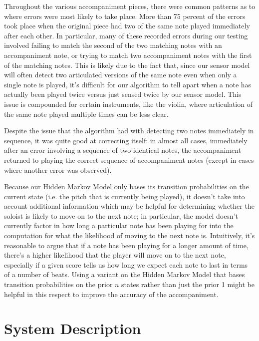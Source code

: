 \documentclass[11pt]{article}
\begin{document}
Throughout the various accompaniment pieces, there were common patterns as to where
errors were most likely to take place.
More than 75 percent of the errors took place when the original piece had two of the
same note played immediately after each other.
In particular, many of these recorded errors during our testing involved failing to
match the second of the two matching notes with an accompaniment note, or trying to match
two accompaniment notes with the first of the matching notes. This is likely due to
the fact that, since our sensor model will often detect two articulated versions of
the same note even when only a single note is played, it's difficult for our algorithm
to tell apart when a note has actually been played twice versus just sensed twice
by our sensor model. This issue is compounded for certain instruments, like the violin,
where articulation of the same note played multiple times can be less clear.

Despite the issue that the algorithm had with detecting two notes immediately
in sequence, it was quite good at correcting itself: in almost all cases, immediately
after an error involving a sequence of two identical notes, the accompaniment
returned to playing the correct sequence of accompaniment notes (except in cases
where another error was observed).

Because our Hidden Markov Model only bases its transition probabilities
on the current state (i.e. the pitch that is currently being played), it doesn't
take into account additional information which may be helpful for determining
whether the soloist is likely to move on to the next note; in particular,
the model doesn't currently factor in how long a particular note has been playing for
into the computation for what the likelihood of moving to the next note is.
Intuitively, it's reasonable to argue that if a note has been playing for a longer
amount of time, there's a higher likelihood that the player will move on to the next note,
especially if a given score tells us how long we expect each note to last in terms
of a number of beats. Using a variant on the Hidden Markov Model that bases transition
probabilities on the prior $n$ states rather than just the prior 1 might be helpful
in this respect to improve the accuracy of the accompaniment.

\appendix

\section{System Description}
\end{document}

